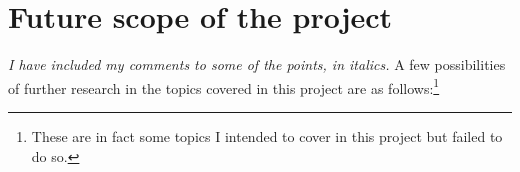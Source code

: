 \documentclass[12pt]{article}
\numberwithin{equation}{section}
\begin{document}

\section{Future scope of the project}
\textit{I have included my comments to some of the points, in italics.} A few possibilities of further research in the topics covered in this project are as follows:\footnote{These are in fact some topics I intended to cover in this project but failed to do so.} 
\end{document}
